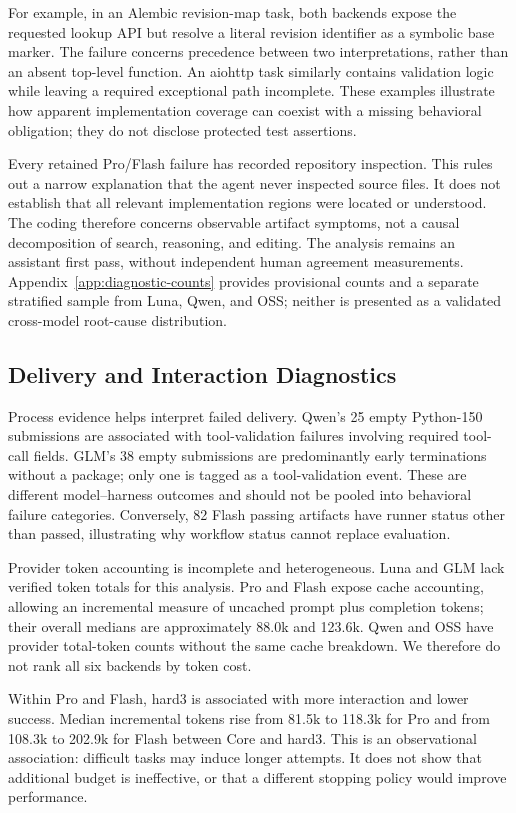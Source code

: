 \documentclass[acmsmall,screen,review,anonymous]{acmart}
\begin{document}
For example, in an Alembic revision-map task, both backends expose the requested
lookup API but resolve a literal revision identifier as a symbolic base marker.
The failure concerns precedence between two interpretations, rather than an
absent top-level function. An aiohttp task similarly contains validation logic
while leaving a required exceptional path incomplete. These examples illustrate
how apparent implementation coverage can coexist with a missing behavioral
obligation; they do not disclose protected test assertions.

Every retained Pro/Flash failure has recorded repository inspection. This rules
out a narrow explanation that the agent never inspected source files. It does
not establish that all relevant implementation regions were located or understood.
The coding therefore concerns observable artifact symptoms, not a causal
decomposition of search, reasoning, and editing. The analysis remains an
assistant first pass, without independent human agreement measurements.
Appendix~\ref{app:diagnostic-counts} provides provisional counts and a separate
stratified sample from Luna, Qwen, and OSS; neither is presented as a validated
cross-model root-cause distribution.

\subsection{Delivery and Interaction Diagnostics}

Process evidence helps interpret failed delivery. Qwen's 25 empty Python-150
submissions are associated with tool-validation failures involving required
tool-call fields. GLM's 38 empty submissions are predominantly early terminations
without a package; only one is tagged as a tool-validation event. These are
different model--harness outcomes and should not be pooled into behavioral
failure categories. Conversely, 82 Flash passing artifacts have runner status
other than passed, illustrating why workflow status cannot replace evaluation.

Provider token accounting is incomplete and heterogeneous. Luna and GLM lack
verified token totals for this analysis. Pro and Flash expose cache accounting,
allowing an incremental measure of uncached prompt plus completion tokens;
their overall medians are approximately 88.0k and 123.6k. Qwen and OSS have
provider total-token counts without the same cache breakdown. We therefore
do not rank all six backends by token cost.

Within Pro and Flash, hard3 is associated with more interaction and lower
success. Median incremental tokens rise from 81.5k to 118.3k for Pro and from
108.3k to 202.9k for Flash between Core and hard3. This is an observational
association: difficult tasks may induce longer attempts. It does not show
that additional budget is ineffective, or that a different stopping policy
would improve performance.
\end{document}
